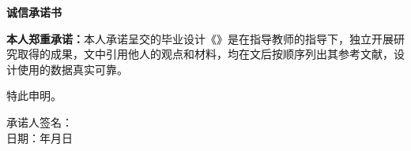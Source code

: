 %
%
%
%
%
%


\pagestyle{originality}
\topskip=0pt

\newcommand{\circled}[2][]{\tikz[baseline=(char.base)]
  {\node[shape = circle, draw, inner sep = 1pt]
  (char) {\phantom{\ifblank{#1}{#2}{#1}}};
  \node at (char.center) {\makebox[0pt][c]{#2}};}}
\robustify{\circled}

\setlength{\parskip}{0.4em}
\renewcommand{\baselinestretch}{1.41}

\vspace*{-6mm}

\begin{center}
  \heiti{}\textbf{诚信承诺书}
\end{center}


\textbf{本人郑重承诺：}本人承诺呈交的毕业设计《\thesisTitle》是在指导教师的指导下，独立开展研究取得的成果，文中引用他人的观点和材料，均在文后按顺序列出其参考文献，设计使用的数据真实可靠。

特此申明。

\vspace{60mm}

\begin{flushright}
  承诺人签名：\underline{\hspace{5cm}}\\
  \vspace{5mm}
  日期：\underline{\hspace{2cm}}年\underline{\hspace{1cm}}月\underline{\hspace{1cm}}日
\end{flushright}

\newpage
